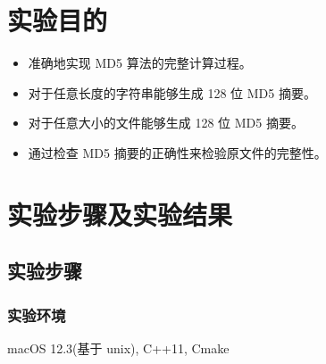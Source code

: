 \documentclass[UTF8,a4paper,10pt]{ctexart}
\begin{document}
\section{实验目的}
\begin{itemize}
    \item 准确地实现 MD5 算法的完整计算过程。
    \item 对于任意长度的字符串能够生成 128 位 MD5 摘要。
    \item 对于任意大小的文件能够生成 128 位 MD5 摘要。
    \item 通过检查 MD5 摘要的正确性来检验原文件的完整性。
\end{itemize}

\section{实验步骤及实验结果}
\subsection{实验步骤}
\subsubsection{实验环境}
macOS 12.3(基于 unix), C++11, Cmake
\end{document}
